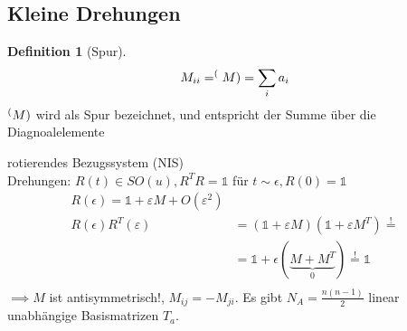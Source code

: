 \documentclass[a4paper]{scrartcl}
\theoremstyle{definition}
\newtheorem{defn}{Definition}
\theoremstyle{plain}
\theoremstyle{remark}
\theoremstyle{remark}
\newcommand{\eps}{\ensuremath{\varepsilon}}%
\begin{document}
\subsection{Kleine Drehungen}
\label{sec-7-4}
\begin{defn}[Spur]
\[M_{ii} = \sp(M) = \sum_i a_i\]
$\sp(M)$ wird als Spur bezeichnet, und entspricht der Summe über die Diagnoalelemente
\end{defn}
rotierendes Bezugssystem (NIS) \\
   Drehungen: $R(t) \in SO(u), R^{T} R = \mathbb{1}$ für $t \sim \epsilon, R(0) = \mathbb{1}$
\begin{align*}
R(\epsilon) = \mathbb{1} + \eps M + O(\eps^2) \\
R(\epsilon) R^{T}(\eps) &= (\mathbb{1} + \eps M)(\mathbb{1} + \eps M^T) \overset{!}{=} \\
&= \mathbb{1} + \epsilon(\underbrace{M + M^T}_{0}) \overset{!}{=} \mathbb{1} \\
\end{align*}
$\implies M$ ist antisymmetrisch!, $M_{ij} = -M_{ji}$. Es gibt $N_A = \frac{n(n - 1)}{2}$ linear unabhängige Basismatrizen $T_a$.
\end{document}

